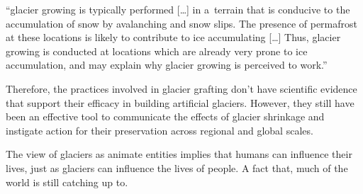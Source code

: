 \begin{thesis_quotation}

“glacier growing is typically performed […] in a terrain that is conducive to the accumulation of snow by
avalanching and snow slips. The presence of permafrost at these locations is likely to contribute to ice
accumulating […] Thus, glacier growing is conducted at locations which are already very prone to ice
accumulation, and may explain why glacier growing is perceived to work.” 

\end{thesis_quotation}

Therefore, the practices involved in glacier grafting don't have scientific evidence that support their efficacy
in building artificial glaciers. However, they still have been an effective tool to communicate the effects of
glacier shrinkage and instigate action for their preservation across regional and global scales. 

The view of glaciers as animate entities implies that humans can influence their lives, just as glaciers can
influence the lives of people. A fact that, much of the world is still catching up to.


